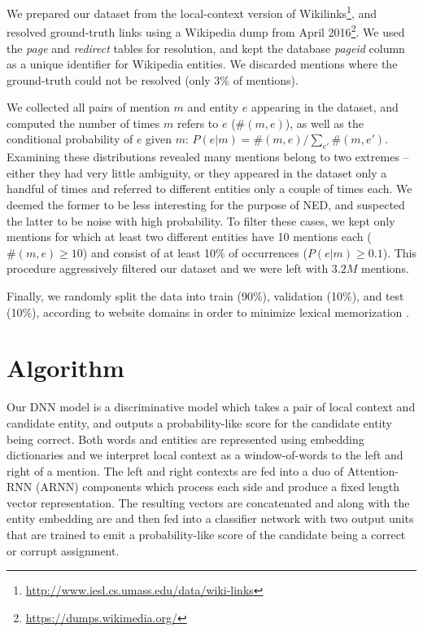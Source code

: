 \documentclass[11pt,letterpaper]{article}
\begin{document}
	We prepared our dataset from the local-context version of Wikilinks\footnote{\url{http://www.iesl.cs.umass.edu/data/wiki-links}}, and resolved ground-truth links using a Wikipedia dump from April 2016\footnote{\url{https://dumps.wikimedia.org/}}. We used the \emph{page} and \emph{redirect} tables for resolution, and kept the database \emph{pageid} column as a unique identifier for Wikipedia entities. We discarded mentions where the ground-truth could not be resolved (only 3\% of mentions).
	
	We collected all pairs of mention $m$ and entity $e$ appearing in the dataset, and computed the number of times $m$ refers to $e$ ($\#(m,e)$), as well as the conditional probability of $e$ given $m$: $P(e|m)=\#(m,e)/\sum_{e'}\#(m,e')$. Examining these distributions revealed many mentions belong to two extremes -- either they had very little ambiguity, or they appeared in the dataset only a handful of times and referred to different entities only a couple of times each. We deemed the former to be less interesting for the purpose of NED, and suspected the latter to be noise with high probability. To filter these cases, we kept only mentions for which at least two different entities have 10 mentions each ($\#(m,e) \ge 10$) and consist of at least 10\% of occurrences ($P(e|m) \ge 0.1$). This procedure aggressively filtered our dataset and we were left with $3.2M$ mentions.
	
	Finally, we randomly split the data into train (90\%), validation (10\%), and test (10\%), according to website domains in order to minimize lexical memorization \cite{levy2015supervised}.
	
	
	\section{Algorithm}
	
	Our DNN model is a discriminative model which takes a pair of local context and candidate entity, and outputs a probability-like score for the candidate entity being correct. Both words and entities are represented using embedding dictionaries and we interpret local context as a window-of-words to the left and right of a mention. The left and right contexts are fed into a duo of Attention-RNN (ARNN) components which process each side and produce a fixed length vector representation. The resulting vectors are concatenated and along with the entity embedding are and then fed into a classifier network with two output units that are trained to emit a probability-like score of the candidate being a correct or corrupt assignment. 
	
\end{document}
